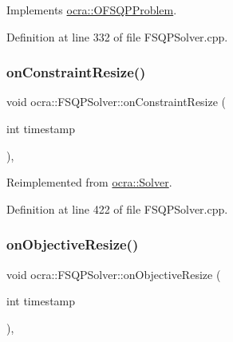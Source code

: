 Implements \hyperlink{classocra_1_1OFSQPProblem_adca0c224eb1b9f6e0c2d17f07277a899}{ocra\+::\+O\+F\+S\+Q\+P\+Problem}.



Definition at line 332 of file F\+S\+Q\+P\+Solver.\+cpp.

\hypertarget{classocra_1_1FSQPSolver_a4bee18cc63de9aabefe747e052662351}{}\label{classocra_1_1FSQPSolver_a4bee18cc63de9aabefe747e052662351} 
\subsubsection{\texorpdfstring{on\+Constraint\+Resize()}{onConstraintResize()}}
{\footnotesize\ttfamily void ocra\+::\+F\+S\+Q\+P\+Solver\+::on\+Constraint\+Resize (\begin{DoxyParamCaption}\item[{int}]{timestamp }\end{DoxyParamCaption})\hspace{0.3cm}{\ttfamily [protected]}, {\ttfamily [virtual]}}



Reimplemented from \hyperlink{classocra_1_1Solver_ad74c2f36dcee107636675bb6ff16e26a}{ocra\+::\+Solver}.



Definition at line 422 of file F\+S\+Q\+P\+Solver.\+cpp.

\hypertarget{classocra_1_1FSQPSolver_a87f59b841b1101fd552f7f9de3d3d99d}{}\label{classocra_1_1FSQPSolver_a87f59b841b1101fd552f7f9de3d3d99d} 
\subsubsection{\texorpdfstring{on\+Objective\+Resize()}{onObjectiveResize()}}
{\footnotesize\ttfamily void ocra\+::\+F\+S\+Q\+P\+Solver\+::on\+Objective\+Resize (\begin{DoxyParamCaption}\item[{int}]{timestamp }\end{DoxyParamCaption})\hspace{0.3cm}{\ttfamily [protected]}, {\ttfamily [virtual]}}



